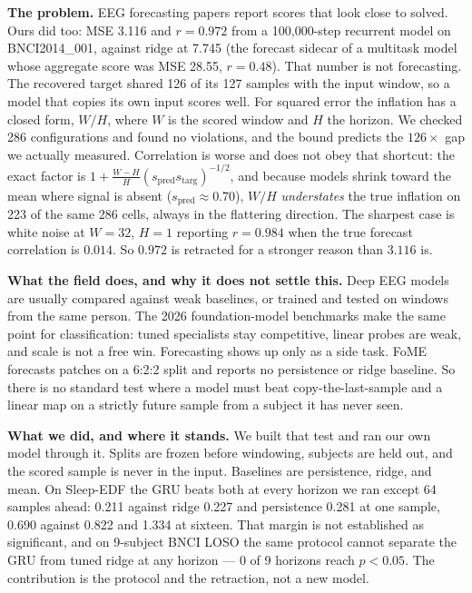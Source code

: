 \documentclass[11pt]{article}
\newcommand{\lead}[1]{\textbf{\color{navy}#1}}
\begin{document}
\vspace{6pt}

\lead{The problem.}
EEG forecasting papers report scores that look close to solved. Ours did too:
MSE 3.116 and $r = 0.972$ from a 100{,}000-step recurrent model on
BNCI2014\_001, against ridge at 7.745 (the forecast sidecar of a multitask
model whose aggregate score was MSE 28.55, $r = 0.48$). That number is not
forecasting. The recovered target shared 126 of its 127 samples with the
input window, so a model
that copies its own input scores well. For squared error the inflation has a
closed form, $W/H$, where $W$ is the scored window and $H$ the horizon. We
checked 286 configurations and found no violations, and the bound predicts the
$126\times$ gap we actually measured. %
Correlation is worse and does not obey
that shortcut: the exact factor is
$1 + \frac{W-H}{H}\left(s_{\mathrm{pred}} s_{\mathrm{targ}}\right)^{-1/2}$,
and because models shrink toward the mean where signal is absent
($s_{\mathrm{pred}} \approx 0.70$), $W/H$ \emph{understates} the true inflation
on 223 of the same 286 cells, always in the flattering direction. The sharpest
case is white noise at $W{=}32$, $H{=}1$ reporting $r = 0.984$ when the true
forecast correlation is $0.014$. So $0.972$ is retracted for a stronger reason
than $3.116$ is.

\lead{What the field does, and why it does not settle this.}
Deep EEG models are usually compared against weak baselines, or trained and
tested on windows from the same person. The 2026 foundation-model benchmarks
make the same point for classification: tuned specialists stay competitive,
linear probes are weak, and scale is not a free win. Forecasting shows up only
as a side task. FoME forecasts patches on a 6:2:2 split and reports no
persistence or ridge baseline. So there is no standard test where a model must
beat copy-the-last-sample and a linear map on a strictly future sample from a
subject it has never seen.

\lead{What we did, and where it stands.}
We built that test and ran our own model through it. Splits are frozen before
windowing, subjects are held out, and the scored sample is never in the input.
Baselines are persistence, ridge, and mean. On Sleep-EDF the GRU beats both at
every horizon we ran except 64 samples ahead: 0.211 against ridge 0.227 and
persistence 0.281 at one sample, 0.690 against 0.822 and 1.334 at sixteen. That
margin is not established as significant, and on 9-subject BNCI LOSO the same
protocol cannot separate the GRU from tuned ridge at any horizon --- 0 of 9
horizons reach $p < 0.05$. The contribution is the protocol and the retraction,
not a new model.
\end{document}
